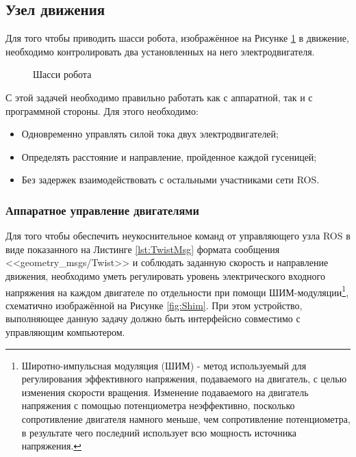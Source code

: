 \documentclass[12pt,a4paper]{scrartcl}
\begin{document}
			\subsection{Узел движения} \label{sec:Movement}
				Для того чтобы приводить шасси робота, изображённое на Рисунке \ref{fig:Robot} в движение, необходимо контролировать два установленных на него электродвигателя. 
				
				\begin{figure}[h]
					\caption{Шасси робота}
					\label{fig:Robot}
				\end{figure}
				
				С этой задачей необходимо правильно работать как с аппаратной, так и с программной стороны. Для этого необходимо:
				
				\begin{itemize}
					\item Одновременно управлять силой тока двух электродвигателей;
					\item Определять расстояние и направление, пройденное каждой гусеницей;
					\item Без задержек взаимодействовать с остальными участниками сети ROS.
				\end{itemize}
				
				\subsubsection{Аппаратное управление двигателями}
					Для того чтобы обеспечить неукоснительное команд от управляющего узла ROS в виде показанного на Листинге \ref{lst:TwistMsg} формата сообщения <<geometry\_msgs/Twist>> и соблюдать заданную скорость и направление движения, необходимо уметь регулировать уровень электрического входного напряжения на каждом двигателе по отдельности при помощи ШИМ-модуляции\footnote{Широтно-импульсная модуляция (ШИМ) - метод используемый для регулирования эффективного напряжения, подаваемого на двигатель, с целью изменения скорости вращения. Изменение подаваемого на двигатель напряжения с помощью потенциометра неэффективно, посколько сопротивление двигателя намного меньше, чем сопротивление потенциометра, в результате чего последний использует всю мощность источника напряжения.}, схематично изображённой на Рисунке \ref{fig:Shim}. При этом устройство, выполняющее данную задачу должно быть интерфейсно совместимо с управляющим компьютером. 
					
\end{document}

